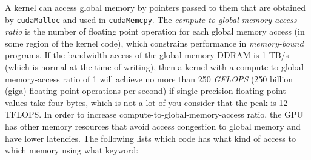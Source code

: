 \documentclass[8pt, table, xcdraw]{article}%
\begin{document}
A kernel can access global memory by pointers passed to them that are obtained by \lstinline{cudaMalloc} and used in \lstinline{cudaMemcpy}. The \emph{compute-to-global-memory-access ratio} is the number of floating point operation for each global memory access (in some region of the kernel code), which constrains performance in \emph{memory-bound} programs. If the bandwidth access of the global memory DDRAM is 1 TB/s (which is normal at the time of writing), then a kernel with a compute-to-global-memory-access ratio of 1 will achieve no more than 250 \emph{GFLOPS} (250 billion (giga) floating point operations per second) if single-precision floating point values take four bytes, which is not a lot of you consider that the peak is 12 TFLOPS. In order to increase compute-to-global-memory-access ratio, the GPU has other memory resources that avoid access congestion to global memory and have lower latencies. The following lists which code has what kind of access to which memory using what keyword:
\end{document}
